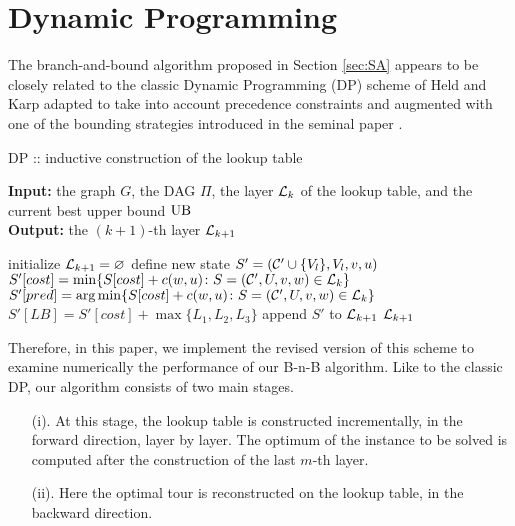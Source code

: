\section{Dynamic Programming}\label{sec:DP}
The branch-and-bound algorithm proposed in Section \ref{sec:SA} appears to be closely related to the classic Dynamic Programming (DP) scheme of Held and Karp  \cite{HeldKarp1962} adapted to take into account precedence constraints and augmented with one of the bounding strategies introduced in the seminal paper \cite{MorinMarsten1976}.

\begin{algorithm}[t]
\caption{DP ::  inductive construction of the lookup table}\label{alg:A2}
\hspace*{\algorithmicindent}\textbf{Input:} the graph $G$, the DAG $\Pi$, the layer $\mathcal{L}_k$ of the lookup table, and the current best upper bound $\mathrm{UB}$\\
\hspace*{\algorithmicindent}\textbf{Output:} the $(k+1)$-th layer $\mathcal{L}_{k+1}$
\begin{algorithmic}[1]
\STATE initialize $\mathcal{L}_{k+1}=\varnothing$
      \STATE define new state $S'=(\mathcal{C}'\cup\{V_l\}, V_l, v, u)$
      \STATE $S'[cost] = \min\{S[cost] + c(w,u)\colon S=(\mathcal{C}',U,v,w)\in\mathcal{L}_k\}$
      \STATE $S'[pred] = \arg\min\{S[cost] + c(w,u)\colon S=(\mathcal{C}',U,v,w)\in\mathcal{L}_k\}$
      \STATE $S'[LB] = S'[cost] + \max\{L_1,L_2,L_3\}$
        \STATE append $S'$ to $\mathcal{L}_{k+1}$
      \ENDIF
    \ENDIF
    \ENDFOR
  \ENDFOR
\ENDFOR
\RETURN $\mathcal{L}_{k+1}$
\end{algorithmic}
\end{algorithm}

Therefore, in this paper, we implement the revised version of this scheme to examine numerically the performance of our B-n-B algorithm.
Like to the classic DP, our algorithm consists of two main stages.
\begin{itemize}
  \item[(i).] At this stage, the lookup table is constructed incrementally, in the forward direction, layer by layer. The optimum of the instance to be solved is computed after the construction of the last $m$-th layer.
  \item[(ii).] Here the optimal tour is reconstructed on the lookup table, in the backward direction.
\end{itemize}

